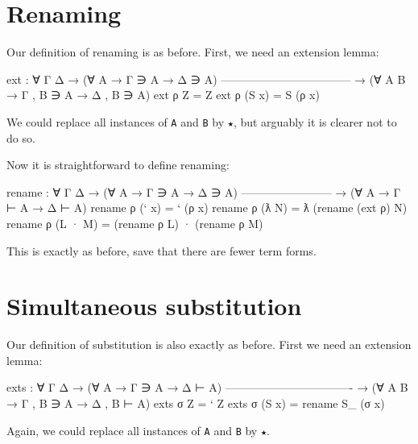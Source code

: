 \hypertarget{renaming}{%
\section{Renaming}\label{renaming}}

Our definition of renaming is as before. First, we need an extension
lemma:

\begin{fence}
\begin{code}
ext : ∀ {Γ Δ} → (∀ {A} → Γ ∋ A → Δ ∋ A)
    -----------------------------------
  → (∀ {A B} → Γ , B ∋ A → Δ , B ∋ A)
ext ρ Z      =  Z
ext ρ (S x)  =  S (ρ x)
\end{code}
\end{fence}

We could replace all instances of \texttt{A} and \texttt{B} by
\texttt{★}, but arguably it is clearer not to do so.

Now it is straightforward to define renaming:

\begin{fence}
\begin{code}
rename : ∀ {Γ Δ}
  → (∀ {A} → Γ ∋ A → Δ ∋ A)
    ------------------------
  → (∀ {A} → Γ ⊢ A → Δ ⊢ A)
rename ρ (` x)          =  ` (ρ x)
rename ρ (ƛ N)          =  ƛ (rename (ext ρ) N)
rename ρ (L · M)        =  (rename ρ L) · (rename ρ M)
\end{code}
\end{fence}

This is exactly as before, save that there are fewer term forms.

\hypertarget{simultaneous-substitution}{%
\section{Simultaneous substitution}\label{simultaneous-substitution}}

Our definition of substitution is also exactly as before. First we need
an extension lemma:

\begin{fence}
\begin{code}
exts : ∀ {Γ Δ} → (∀ {A} → Γ ∋ A → Δ ⊢ A)
    ----------------------------------
  → (∀ {A B} → Γ , B ∋ A → Δ , B ⊢ A)
exts σ Z      =  ` Z
exts σ (S x)  =  rename S_ (σ x)
\end{code}
\end{fence}

Again, we could replace all instances of \texttt{A} and \texttt{B} by
\texttt{★}.

